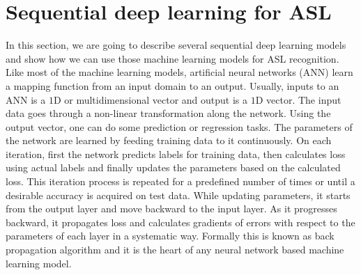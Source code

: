 \documentclass[10pt,twocolumn,letterpaper]{article}
\begin{document}
\section{Sequential deep learning for ASL}
In this section, we are going to describe several sequential deep learning models and show how we can use those machine learning models for ASL recognition. Like most of the machine learning models, artificial neural networks (ANN) learn a mapping function from an input domain to an output. Usually, inputs to an ANN is a $1$D or multidimensional vector and output is a $1$D vector. The input data goes through a non-linear transformation along the network. Using the output vector, one can do some prediction or regression tasks. The parameters of the network are learned by feeding training data to it continuously. On each iteration, first the network predicts labels for training data, then calculates loss using actual labels and finally updates the parameters based on the calculated loss. This iteration process is repeated for a predefined number of times or until a desirable accuracy is acquired on test data. While updating parameters, it starts from the output layer and move backward to the input layer. As it progresses backward, it propagates loss and calculates gradients of errors with respect to the parameters of each layer in a systematic way. Formally this is known as back propagation algorithm and it is the heart of any neural network based machine learning model. 
\end{document}
